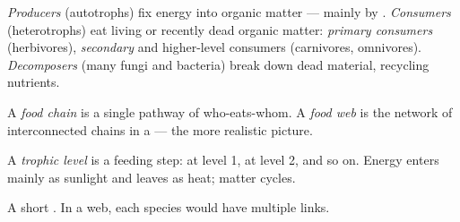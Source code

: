 \begin{definition}\label{def:g10:ecosystems:trophic-roles}
\emph{Producers} (autotrophs) fix energy into organic
matter --- mainly by . \emph{Consumers}
(heterotrophs) eat living or recently dead organic matter:
\emph{primary consumers} (herbivores),
\emph{secondary} and higher-level consumers
(carnivores, omnivores). \emph{Decomposers} (many
fungi and bacteria) break down dead material, recycling nutrients.
\end{definition}

\begin{definition}\label{def:g10:ecosystems:food-web}
A \emph{food chain} is a single pathway of who-eats-whom.
A \emph{food web} is the network of interconnected chains
in a  --- the more realistic picture.
\end{definition}

\begin{definition}\label{def:g10:ecosystems:trophic}
A \emph{trophic level} is a feeding step:
 at level 1,  at level 2, and so on. Energy
enters mainly as sunlight and leaves as heat; matter cycles.
\end{definition}

\begin{omfigure}

{\small A short . In a web, each species would have multiple
links.}
\end{omfigure}

